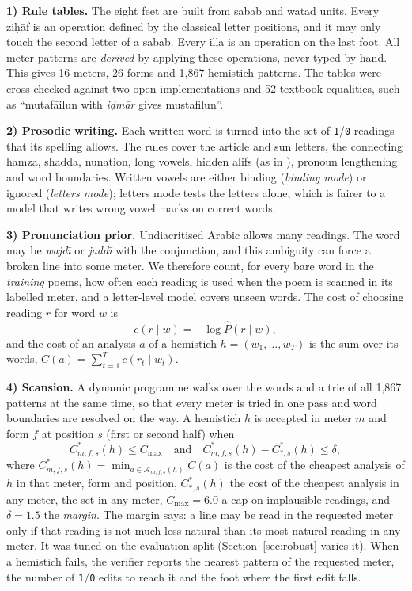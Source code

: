 \textbf{1) Rule tables.} The eight feet are built from sabab and watad units. Every zi\d{h}\=af is an operation defined
by the classical letter positions, and it may only touch the second letter of a sabab. Every \textquotesingle illa is
an operation on the last foot. All meter patterns are \emph{derived} by applying these operations, never typed by
hand. This gives 16 meters, 26 forms and 1,867 hemistich patterns. The tables were cross-checked against two open
implementations and 52 textbook equalities, such as ``mutaf\=a\textquotesingle ilun with \emph{i\d{d}m\=ar} gives
mustaf\textquotesingle ilun''.

\textbf{2) Prosodic writing.} Each written word is turned into the set of \texttt{1}/\texttt{0} readings that its
spelling allows. The rules cover the article and sun letters, the connecting hamza, shadda, nunation, long vowels,
hidden alifs (as in ), pronoun lengthening and word boundaries. Written vowels are either binding
(\emph{binding mode}) or ignored (\emph{letters mode}); letters mode tests the letters alone, which is fairer to a
model that writes wrong vowel marks on correct words.

\textbf{3) Pronunciation prior.} Undiacritised Arabic allows many readings. The word  may be \emph{wajd\={\i}}
or \emph{jadd\={\i}} with the conjunction, and this ambiguity can force a broken line into some meter. We therefore
count, for every bare word in the \emph{training} poems, how often each reading is used when the poem is scanned in
its labelled meter, and a letter-level model covers unseen words. The cost of choosing reading $r$ for word $w$ is
\begin{equation}
c(r \mid w) = -\log \hat{P}(r \mid w),
\label{eq:readcost}
\end{equation}
and the cost of an analysis $a$ of a hemistich $h = (w_1,\dots,w_T)$ is the sum over its words,
$C(a) = \sum_{t=1}^{T} c(r_t \mid w_t)$.

\textbf{4) Scansion.} A dynamic programme walks over the words and a trie of all 1,867 patterns at the same time, so
that every meter is tried in one pass and word boundaries are resolved on the way. A hemistich $h$ is accepted in
meter $m$ and form $f$ at position $s$ (first or second half) when
\begin{equation}
C^{*}_{m,f,s}(h) \le C_{\max}
\quad\text{and}\quad
C^{*}_{m,f,s}(h) - C^{*}_{\ast,s}(h) \le \delta ,
\label{eq:accept}
\end{equation}
where $C^{*}_{m,f,s}(h) = \min_{a \in \mathcal{A}_{m,f,s}(h)} C(a)$ is the cost of the cheapest analysis of $h$ in that
meter, form and position, $C^{*}_{\ast,s}(h)$ the cost of the cheapest analysis in any meter, the set in any meter, $C_{\max}=6.0$ a cap on implausible readings, and $\delta=1.5$ the \emph{margin}. The margin
says: a line may be read in the requested meter only if that reading is not much less natural than its most natural
reading in any meter. It was tuned on the evaluation split (Section~\ref{sec:robust} varies it). When a hemistich
fails, the verifier reports the nearest pattern of the requested meter, the number of \texttt{1}/\texttt{0} edits to
reach it and the foot where the first edit falls.

